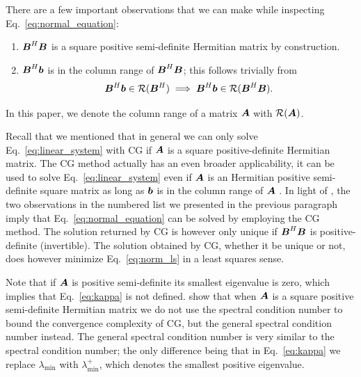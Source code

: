 \documentclass[useAMS,usenatbib]{mn2e}
\newcommand{\bA}{\bmath{A}}
\newcommand{\bB}{\bmath{B}}
\newcommand{\bb}{\bmath{b}}
\begin{document}
There are a few important observations that we can make while inspecting Eq.~\eqref{eq:normal_equation}:
\begin{enumerate}
\item $\bB^H\bB$ is a square positive semi-definite Hermitian matrix by construction.
\item $\bB^H\bb$ is in the column range of $\bB^H\bB$; this follows trivially from 
\begin{equation}
\bB^H\bb \in \mathcal{R}(\bB^H) \implies \bB^H\bb \in \mathcal{R}(\bB^H\bB).   
\end{equation}
\end{enumerate}
In this paper, we denote the column range of a matrix $\bA$ with $\mathcal{R}(\bA)$.

Recall that we mentioned that in general we can only solve Eq.~\eqref{eq:linear_system} with CG if $\bA$ is a square positive-definite Hermitian matrix. The CG method actually has an even broader applicability, it can be used to solve Eq.~\eqref{eq:linear_system} even if $\bA$ is an Hermitian positive semi-definite
square matrix as long as $\bb$ is in the column range of $\bA$ \citep{Lu2015}. In light of \citet{Lu2015}, the two observations in the numbered list we presented in the previous paragraph imply that Eq.~\eqref{eq:normal_equation}
can be solved by employing the CG method. The solution returned by CG is however only unique if $\bB^H\bB$ is positive-definite (invertible). The solution
obtained by CG, whether it be unique or not, does however minimize Eq.~\eqref{eq:norm_ls} in a least squares sense.

Note that if $\bA$ is positive semi-definite its smallest eigenvalue is zero, which implies that Eq.~\eqref{eq:kappa} is not defined. \citet{Lu2015} show that when $\bA$
is a square positive semi-definite Hermitian matrix we do not use the spectral condition number to bound the convergence complexity of CG, but the general spectral condition
number instead. The general spectral condition number is very similar to the spectral condition number; the only difference being that in Eq.~\eqref{eq:kappa} we replace  
$\lambda_{\textrm{min}}$ with $\lambda_{\textrm{min}}^+$, which denotes the smallest positive eigenvalue. 
\end{document}
